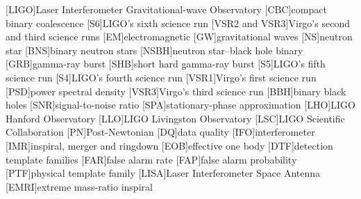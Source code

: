 [LIGO]{Laser Interferometer Gravitational-wave Observatory}
[CBC]{compact binary coalescence}
[S6]{LIGO's sixth science run}
[VSR2 and VSR3]{Virgo's second and third science runs}
[EM]{electromagnetic}
[GW]{gravitational waves}
[NS]{neutron star}
[BNS]{binary neutron stars}
[NSBH]{neutron star--black hole binary}
[GRB]{gamma-ray burst}
[SHB]{short hard gamma-ray burst}
[S5]{LIGO's fifth science run}
[S4]{LIGO's fourth science run}
[VSR1]{Virgo's first science run}
[PSD]{power spectral density}
[VSR3]{Virgo's third science run}
[BBH]{binary black holes}
[SNR]{signal-to-noise ratio}
[SPA]{stationary-phase approximation}
[LHO]{LIGO Hanford Observatory}
[LLO]{LIGO Livingston Observatory}
[LSC]{LIGO Scientific Collaboration}
[PN]{Post-Newtonian}
[DQ]{data quality}
[IFO]{interferometer}
[IMR]{inspiral, merger and ringdown}
[EOB]{effective one body}
[DTF]{detection template families}
[FAR]{false alarm rate}
[FAP]{false alarm probability}
[PTF]{physical template family}
[LISA]{Laser Interferometer Space Antenna}
[EMRI]{extreme mass-ratio inspiral}
